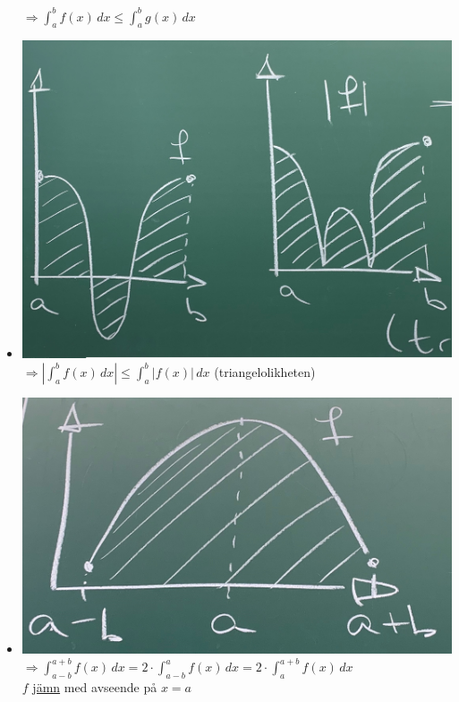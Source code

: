 \begin{itemize}
          $\Rightarrow \int_a^b f(x)\, dx \leq \int_a^b g(x)\, dx$
    \item \includegraphics[scale=0.1]{lessons/lesson15/imgs/img04.jpg}\\
          $\Rightarrow |\int_a^b f(x)\, dx| \leq \int_a^b |f(x)|\, dx$ (triangelolikheten)
    \item \includegraphics[scale=0.1]{lessons/lesson15/imgs/img05.jpg}\\
          $\Rightarrow \int_{a-b}^{a+b} f(x)\, dx = 2\cdot\int_{a-b}^{a} f(x)\, dx = 2\cdot\int_{a}^{a+b} f(x)\, dx$\\
          $f$ \underline{jämn} med avseende på $x=a$

\end{itemize}
